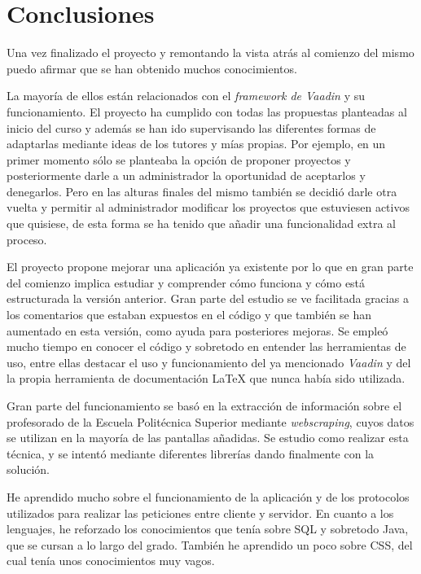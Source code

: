 
\section{Conclusiones}

Una vez finalizado el proyecto y remontando la vista atrás al comienzo del mismo puedo afirmar que se han obtenido muchos conocimientos.

La mayoría de ellos están relacionados con el \emph{framework de Vaadin} y su funcionamiento.
El proyecto ha cumplido con todas las propuestas planteadas al inicio del curso y además se han ido supervisando las diferentes formas de adaptarlas mediante ideas de los tutores y mías propias. 
Por ejemplo, en un primer momento sólo se planteaba la opción de proponer proyectos y posteriormente darle a un administrador la oportunidad de aceptarlos y denegarlos. Pero en las alturas finales del mismo también se decidió darle otra vuelta y permitir al administrador modificar los proyectos que estuviesen activos que quisiese, de esta forma se ha tenido que añadir una funcionalidad extra al proceso.

El proyecto propone mejorar una aplicación ya existente por lo que en gran parte del comienzo implica estudiar y comprender cómo funciona y cómo está estructurada la versión anterior. Gran parte del estudio se ve facilitada gracias a los comentarios que estaban expuestos en el código y que también se han aumentado en esta versión, como ayuda para posteriores mejoras.
Se empleó mucho tiempo en conocer el código y sobretodo en entender las herramientas de uso, entre ellas destacar el uso y funcionamiento del ya mencionado \emph{Vaadin} y del la propia herramienta de documentación \LaTeX{} que nunca había sido utilizada.

Gran parte del funcionamiento se basó en la extracción de información sobre el profesorado de la Escuela Politécnica Superior mediante \emph{webscraping}, cuyos datos se utilizan en la mayoría de las pantallas añadidas. Se estudio como realizar esta técnica, y se intentó mediante diferentes librerías dando finalmente con la solución.

He aprendido mucho sobre el funcionamiento de la aplicación y de los protocolos utilizados para realizar las peticiones entre cliente y servidor. En cuanto a los lenguajes, he reforzado los conocimientos que tenía sobre SQL y sobretodo Java, que se cursan a lo largo del grado. También he aprendido un poco sobre CSS, del cual tenía unos conocimientos muy vagos.

